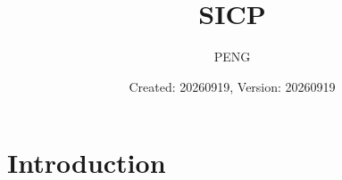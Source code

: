 \documentclass{article}
\title{SICP}
\author{PENG}
\date{Created: 20260919, Version: 20260919}
\begin{document}
\maketitle
\tableofcontents
\section{Introduction}
\cite{ABELSON_1996_STRUCTURE_AND_INTERPRETATION_OF_COMPUTER_PROGRAMS}

\printbibliography
\end{document}
